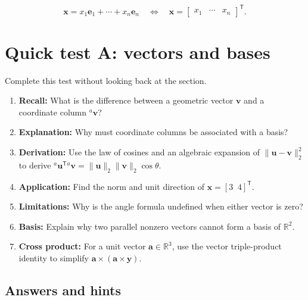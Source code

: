 \documentclass[
  australian,
  12pt,
  letterpaper,
  DIV=11,
  numbers=noendperiod,
  twoside]{scrreprt}
\providecommand{\tightlist}{%
  \setlength{\itemsep}{0pt}\setlength{\parskip}{0pt}}
\begin{document}
\[
\mathbf x=x_1\mathbf e_1+\cdots+x_n\mathbf e_n
\quad\Longleftrightarrow\quad
\mathbf x=
\begin{bmatrix}
x_1&\cdots&x_n
\end{bmatrix}^{\mathsf T}.
\]

\section*{Quick test A: vectors and
bases}\label{quick-test-a-vectors-and-bases}


Complete this test without looking back at the section.

\begin{enumerate}
\def\labelenumi{\arabic{enumi}.}
\tightlist
\item
  \textbf{Recall:} What is the difference between a geometric vector
  \(\mathbf v\) and a coordinate column \({}^{a}\mathbf v\)?
\item
  \textbf{Explanation:} Why must coordinate columns be associated with a
  basis?
\item
  \textbf{Derivation:} Use the law of cosines and an algebraic expansion
  of \(\|\mathbf u-\mathbf v\|_2^2\) to derive
  \({}^{a}\mathbf u^{\mathsf T}{}^{a}\mathbf v=\|\mathbf u\|_2\|\mathbf v\|_2\cos\theta\).
\item
  \textbf{Application:} Find the norm and unit direction of
  \(\mathbf x=[3\;\;4]^\mathsf T\).
\item
  \textbf{Limitations:} Why is the angle formula undefined when either
  vector is zero?
\item
  \textbf{Basis:} Explain why two parallel nonzero vectors cannot form a
  basis of \(\mathbb R^2\).
\item
  \textbf{Cross product:} For a unit vector \(\mathbf a\in\mathbb R^3\),
  use the vector triple-product identity to simplify
  \(\mathbf a\times(\mathbf a\times\mathbf y)\).
\end{enumerate}

\subsection*{Answers and hints}\label{answers-and-hints}
\end{document}
